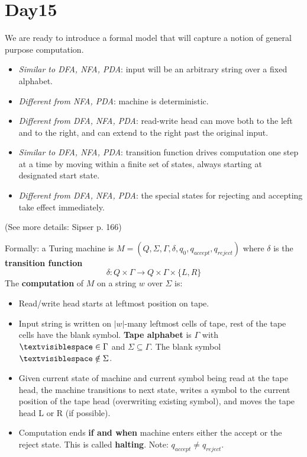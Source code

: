 \documentclass[12pt, oneside]{article}
\begin{document}
\section*{Day15}


We are ready to introduce a formal model that will capture a notion of general purpose computation.
\begin{itemize}
\item {\it Similar to DFA, NFA, PDA}: input will be an arbitrary string over a fixed alphabet.
\item {\it Different from NFA, PDA}: machine is deterministic.
\item {\it Different from DFA, NFA, PDA}: read-write head can move both to the left and to the right,
and can extend to the right past the original input.
\item {\it Similar to DFA, NFA, PDA}: transition function drives computation one step at a time 
by moving within a finite set of states, always starting at designated start state.
\item {\it Different from DFA, NFA, PDA}: the special states for rejecting and accepting take effect immediately.
\end{itemize}

\vspace{-10pt}

(See more details: Sipser p. 166)

\vfill

Formally: a  Turing machine is $M= (Q, \Sigma, \Gamma, \delta, q_0, q_{accept}, q_{reject})$ 
where $\delta$ is the {\bf transition function} 
\[
  \delta: Q\times \Gamma \to Q \times \Gamma \times \{L, R\}
\]
The {\bf computation} of $M$ on a string $w$ over $\Sigma$  is:

\vspace{-10pt}

\begin{itemize}
\setlength{\itemsep}{0pt}
\item Read/write head starts at leftmost position on tape. 
\item Input string is written on $|w|$-many leftmost cells of tape, 
rest of  the tape cells have  the blank symbol. {\bf Tape alphabet} 
is $\Gamma$ with $\textvisiblespace\in \Gamma$ and $\Sigma \subseteq \Gamma$.
The blank symbol $\textvisiblespace \notin \Sigma$.
\item Given current state of machine and current symbol being read at the tape head, 
the machine transitions to next state, writes a symbol to the current position  of the 
tape  head (overwriting existing symbol), and moves the tape head L or R (if possible). 
\item Computation ends {\bf if and when} machine enters either the accept or the reject state.
This is called {\bf halting}.
Note: $q_{accept} \neq q_{reject}$.
\end{itemize}
\end{document}
